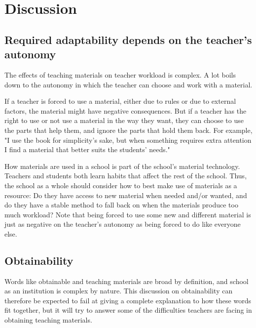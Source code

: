 \chapter{Discussion}
\section{Required adaptability depends on the teacher's autonomy}
The effects of teaching materials on teacher workload is complex. A lot boils down to the autonomy in which the teacher can choose and work with a material.

If a teacher is forced to use a material, either due to rules or due to external factors, the material might have negative consequences. But if a teacher has the right to use or not use a material in the way they want, they can choose to use the parts that help them, and ignore the parts that hold them back. For example, "I use the book for simplicity's sake, but when something requires extra attention I find a material that better suits the students' needs."

How materials are used in a school is part of the school's material technology. Teachers and students both learn habits that affect the rest of the school. Thus, the school as a whole should consider how to best make use of materials as a resource: Do they have access to new material when needed and/or wanted, and do they have a stable method to fall back on when the materials produce too much workload? Note that being forced to use some new and different material is just as negative on the teacher's autonomy as being forced to do like everyone else.

\section{Obtainability}
Words like obtainable and teaching materials are broad by definition, and school as an institution is complex by nature. This discussion on obtainability can therefore be expected to fail at giving a complete explanation to how these words fit together, but it will try to answer some of the difficulties teachers are facing in obtaining teaching materials.

